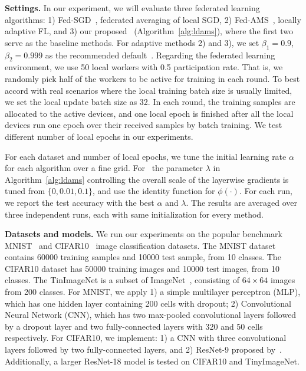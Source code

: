 \documentclass[twoside]{article}
\begin{document}
\vspace{0.1in}
\noindent\textbf{Settings.} In our experiment, we will evaluate three federated learning algorithms: 1) Fed-SGD~\cite{mcmahan2017communication}, federated averaging of local SGD, 2) Fed-AMS~\cite{chen2020toward}, locally adaptive FL, and 3) our proposed \algo\ (Algorithm~\ref{alg:ldams}), where the first two serve as the baseline methods. For adaptive methods 2) and 3), we set $\beta_1=0.9$, $\beta_2=0.999$ as the recommended default~\citep{reddi2019convergence}. Regarding the federated learning environment, we use 50 local workers with 0.5 participation rate. That is, we randomly pick half of the workers to be active for training in each round. To best accord with real scenarios where the local training batch size is usually limited, we set the local update batch size as 32. In each round, the training samples are allocated to the active devices, and one local epoch is finished after all the local devices run one epoch over their received samples by batch training. We test different number of local epochs in our experiments. 

For each dataset and number of local epochs, we tune the initial learning rate $\alpha$ for each algorithm over a fine grid. For \algo\, the parameter $\lambda$ in Algorithm~\ref{alg:ldams} controlling the overall scale of the layerwise gradients is tuned from $\{0,0.01,0.1\}$, and use the identity function for $\phi(\cdot)$.
For each run, we report the test accuracy with the best $\alpha$ and $\lambda$. The results are averaged over three independent runs, each with same initialization for every method.

\vspace{0.1in}
\noindent\textbf{Datasets and models.} We run our experiments on the popular benchmark MNIST~\citep{lecun1998mnist} and CIFAR10~\citep{krizhevsky2009learning} image classification datasets. The MNIST dataset contains 60000 training samples and 10000 test sample, from 10 classes. The CIFAR10 dataset has 50000 training images and 10000 test images, from 10 classes. The TinImageNet is a subset of ImageNet~\citep{deng2009imagenet}, consisting of $64\times 64$ images from 200 classes. For MNIST, we apply 1) a simple multilayer perceptron (MLP), which has one hidden layer containing 200 cells with dropout; 2) Convolutional Neural Network (CNN), which has two max-pooled convolutional layers followed by a dropout layer and two fully-connected layers with 320 and 50 cells respectively. For CIFAR10, we implement: 1) a CNN with three convolutional layers followed by two fully-connected layers, and 2) ResNet-9 proposed by~\cite{Proc:He-resnet16}. 
Additionally, a larger ResNet-18 model is tested on CIFAR10 and TinyImageNet. 
\end{document}
